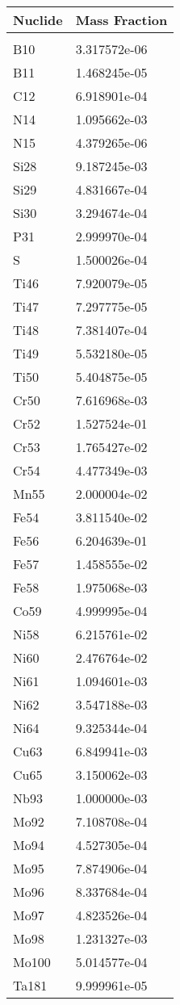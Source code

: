 \begin{centering}
\begin{longtable}[ht!]
{ p{} | p{} }
\hline
Nuclide & Mass Fraction\\
\hline
\\
B10 & 3.317572e-06\\
B11 & 1.468245e-05\\
C12 & 6.918901e-04\\
N14 & 1.095662e-03\\
N15 & 4.379265e-06\\
Si28 & 9.187245e-03\\
Si29 & 4.831667e-04\\
Si30 & 3.294674e-04\\
P31 & 2.999970e-04\\
S & 1.500026e-04\\
Ti46 & 7.920079e-05\\
Ti47 & 7.297775e-05\\
Ti48 & 7.381407e-04\\
Ti49 & 5.532180e-05\\
Ti50 & 5.404875e-05\\
Cr50 & 7.616968e-03\\
Cr52 & 1.527524e-01\\
Cr53 & 1.765427e-02\\
Cr54 & 4.477349e-03\\
Mn55 & 2.000004e-02\\
Fe54 & 3.811540e-02\\
Fe56 & 6.204639e-01\\
Fe57 & 1.458555e-02\\
Fe58 & 1.975068e-03\\
Co59 & 4.999995e-04\\
Ni58 & 6.215761e-02\\
Ni60 & 2.476764e-02\\
Ni61 & 1.094601e-03\\
Ni62 & 3.547188e-03\\
Ni64 & 9.325344e-04\\
Cu63 & 6.849941e-03\\
Cu65 & 3.150062e-03\\
Nb93 & 1.000000e-03\\
Mo92 & 7.108708e-04\\
Mo94 & 4.527305e-04\\
Mo95 & 7.874906e-04\\
Mo96 & 8.337684e-04\\
Mo97 & 4.823526e-04\\
Mo98 & 1.231327e-03\\
Mo100 & 5.014577e-04\\
Ta181 & 9.999961e-05\\


\end{longtable}
\end{centering}
